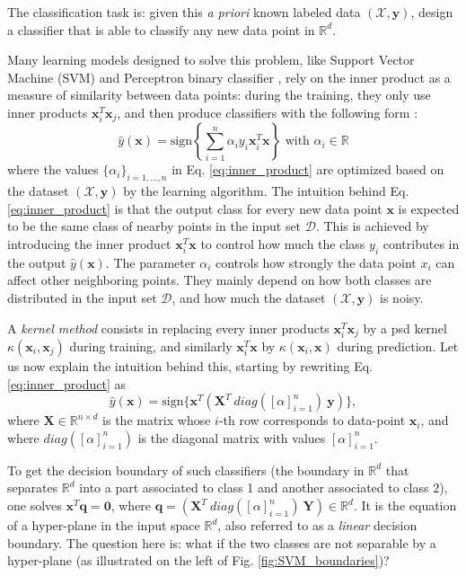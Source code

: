 The classification task is: given this \emph{a priori} known labeled data $(\mathcal{X},\mathbf{y})$, design a classifier that is able to classify any new data point in $\mathbb{R}^d$. 

Many learning models designed to solve this problem, like Support Vector Machine (SVM)  and Perceptron binary classifier , rely on the inner product as a measure of similarity between data points: during the training, they only use inner products $\mathbf{x}_i^T \mathbf{x}_j$, and then produce classifiers with the following form \citep{inner_product}:
\begin{equation}
\label{eq:inner_product}
 \hat{y}(\mathbf{x})=\text{sign}\left\{\sum_{i=1}^n\alpha_iy_i\mathbf{x}_i^T\mathbf{x}\right\} \text{ with } \alpha_i\in \mathbb{R}
\end{equation}
where the values $\{\alpha_i\}_{i=1,\ldots,n}$ in Eq. \ref{eq:inner_product} are optimized based on the dataset $(\mathcal{X},\mathbf{y})$ by the learning algorithm. The intuition behind Eq. \ref{eq:inner_product} is that the output class for every new data point $\mathbf{x}$ is expected to be the same class of nearby points in the input set $\mathcal{D}$. This is achieved by introducing the inner product $\mathbf{x}_i^T\mathbf{x}$ to control how much the class $y_i$ contributes in the output $\hat{y}(\mathbf{x})$. The parameter $\alpha_i$ controls how strongly the data point $x_i$ can affect other neighboring points. They mainly depend on how both classes are distributed in the input set $\mathcal{D}$, and  how much the dataset $(\mathcal{X},\mathbf{y})$ is noisy. 



A \emph{kernel method} consists in replacing every inner products $\mathbf{x}_i^T \mathbf{x}_j$ by a psd kernel $\kappa(\mathbf{x}_i, \mathbf{x}_j)$ during training, and similarly $\mathbf{x}_i^T\mathbf{x}$ by $\kappa(\mathbf{x}_i, \mathbf{x})$ during prediction.
Let us now explain the intuition behind this, starting by rewriting Eq. \ref{eq:inner_product} as 
\[
\hat{y}(\mathbf{x})=\text{sign}\{\textbf{x}^T(\mathbf{X}^T~diag([\alpha]_{i=1}^n)~\mathbf{y})\},
\]
where $\mathbf{X}\in\mathbb{R}^{n\times d}$ is the matrix whose $i$-th row corresponds to data-point $\mathbf{x}_i$, and where $diag([\alpha]_{i=1}^n)$ is the diagonal matrix with values $[\alpha]_{i=1}^n$. 

To get the decision boundary of such classifiers (the boundary in $\mathbb{R}^d$ that separates $\mathbb{R}^d$ into a part associated to class 1 and another associated to class $2$), one solves $\mathbf{x}^T\mathbf{q}=\mathbf{0}$, where $\textbf{q}=(\mathbf{X}^T~diag([\alpha]_{i=1}^n)~\mathbf{Y})\in\mathbb{R}^d$. It is the equation of a hyper-plane in the input space $\mathbb{R}^d$, also referred to as a \emph{linear} decision boundary. 
The question here is: what if the two classes are not separable by a hyper-plane (as illustrated on the left of Fig. \ref{fig:SVM_boundaries})? 

